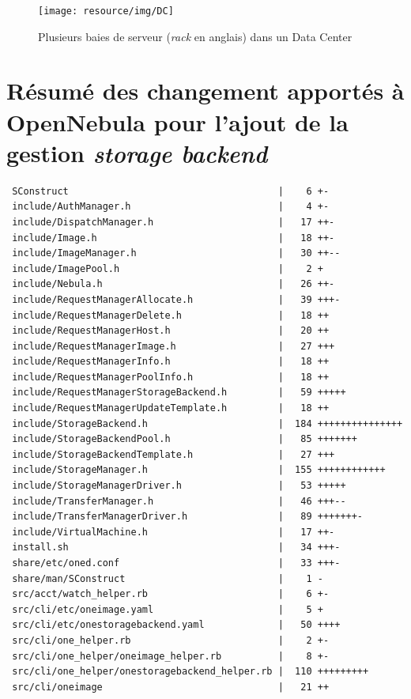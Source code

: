 \begin{figure}[H]
	\centering
	\texttt{[image: resource/img/DC]}
	\caption{Plusieurs baies de serveur (\emph{rack} en anglais) dans un Data Center}
	\label{datacenter}
\end{figure}

\chapter*{Résumé des changement apportés à OpenNebula pour l'ajout de la gestion \emph{storage backend}}
\label{modopennebula}
\begin{lstlisting}
 SConstruct                                     |    6 +-
 include/AuthManager.h                          |    4 +-
 include/DispatchManager.h                      |   17 ++-
 include/Image.h                                |   18 ++-
 include/ImageManager.h                         |   30 ++--
 include/ImagePool.h                            |    2 +
 include/Nebula.h                               |   26 ++-
 include/RequestManagerAllocate.h               |   39 +++-
 include/RequestManagerDelete.h                 |   18 ++
 include/RequestManagerHost.h                   |   20 ++
 include/RequestManagerImage.h                  |   27 +++
 include/RequestManagerInfo.h                   |   18 ++
 include/RequestManagerPoolInfo.h               |   18 ++
 include/RequestManagerStorageBackend.h         |   59 +++++
 include/RequestManagerUpdateTemplate.h         |   18 ++
 include/StorageBackend.h                       |  184 +++++++++++++++
 include/StorageBackendPool.h                   |   85 +++++++
 include/StorageBackendTemplate.h               |   27 +++
 include/StorageManager.h                       |  155 ++++++++++++
 include/StorageManagerDriver.h                 |   53 +++++
 include/TransferManager.h                      |   46 +++--
 include/TransferManagerDriver.h                |   89 +++++++-
 include/VirtualMachine.h                       |   17 ++-
 install.sh                                     |   34 +++-
 share/etc/oned.conf                            |   33 +++-
 share/man/SConstruct                           |    1 -
 src/acct/watch_helper.rb                       |    6 +-
 src/cli/etc/oneimage.yaml                      |    5 +
 src/cli/etc/onestoragebackend.yaml             |   50 ++++
 src/cli/one_helper.rb                          |    2 +-
 src/cli/one_helper/oneimage_helper.rb          |    8 +-
 src/cli/one_helper/onestoragebackend_helper.rb |  110 +++++++++
 src/cli/oneimage                               |   21 ++

\end{lstlisting}
